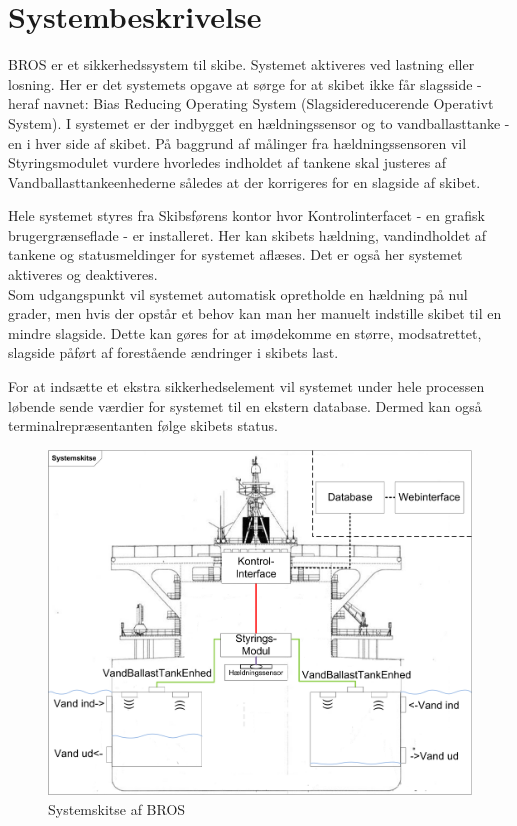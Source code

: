 \chapter{Systembeskrivelse}
\label{ch:Systembeskrivelse}
BROS er et sikkerhedssystem til skibe. Systemet aktiveres ved lastning eller losning. Her er det systemets opgave at sørge for at skibet ikke får slagsside - heraf navnet: Bias Reducing Operating System (Slagsidereducerende Operativt System).
I systemet er der indbygget en hældningssensor og to vandballasttanke - en i hver side af skibet. På baggrund af målinger fra hældningssensoren vil Styringsmodulet vurdere hvorledes indholdet af tankene skal justeres af Vandballasttankeenhederne således at der korrigeres for en slagside af skibet.

Hele systemet styres fra Skibsførens kontor hvor Kontrolinterfacet - en grafisk brugergrænseflade - er installeret. Her kan skibets hældning, vandindholdet af tankene og statusmeldinger for systemet aflæses. Det er også her systemet aktiveres og deaktiveres.\\
Som udgangspunkt vil systemet automatisk opretholde en hældning på nul grader, men hvis der opstår et behov kan man her manuelt indstille skibet til en mindre slagside. Dette kan gøres for at imødekomme en større, modsatrettet, slagside påført af forestående ændringer i skibets last.

For at indsætte et ekstra sikkerhedselement vil systemet under hele processen løbende sende værdier for systemet til en ekstern database. Dermed kan også terminalrepræsentanten følge skibets status.

\begin{figure}[H]
\centering
\includegraphics[width = .72\textwidth]{billeder/systemfigur}
\caption{Systemskitse af BROS}
\label{fig:systemskitse}
\end{figure}